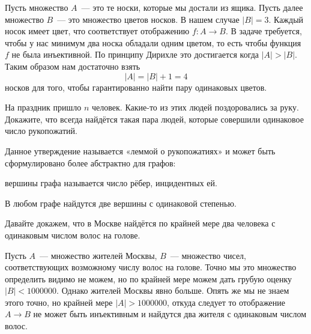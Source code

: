 Пусть множество $A$~— это те носки, которые мы достали из ящика. Пусть далее множество $B$~— это множество цветов носков. В нашем случае $|B|=3$. Каждый носок имеет цвет, что соответствует отображению $f:A\to B$. В задаче требуется, чтобы у нас минимум два носка обладали одним цветом, то есть чтобы функция $f$ не была инъективной. По принципу Дирихле это достигается когда $|A|>|B|$. Таким образом нам достаточно взять $$|A|=|B|+1 = 4$$ носков для того, чтобы гарантированно найти пару одинаковых цветов.

\begin{exercise}
На праздник пришло $n$ человек. Какие-то из этих людей поздоровались за руку. Докажите, что всегда найдётся такая пара людей, которые совершили одинаковое число рукопожатий.
\end{exercise}

Данное утверждение называется «леммой о рукопожатиях» и может быть сформулировано более абстрактно для графов:

\begin{definition}
 вершины графа называется число рёбер, инцидентных ей.
\end{definition}

\begin{HandshakesLemma}
В любом графе найдутся две вершины с одинаковой степенью.
\end{HandshakesLemma}

\begin{example}
Давайте докажем, что в Москве найдётся по крайней мере два человека с одинаковым числом волос на голове.

Пусть $A$~— множество жителей Москвы, $B$~— множество чисел, соответствующих возможному числу волос на голове. Точно мы это множество определить видимо не можем, но по крайней мере можем дать грубую оценку $|B|<1000000$. Однако жителей Москвы явно больше. Опять же мы не знаем этого точно, но крайней мере $|A|>1000000$, откуда следует то отображение $A\to B$ не может быть инъективным и найдутся два жителя с одинаковым числом волос.
\end{example}

